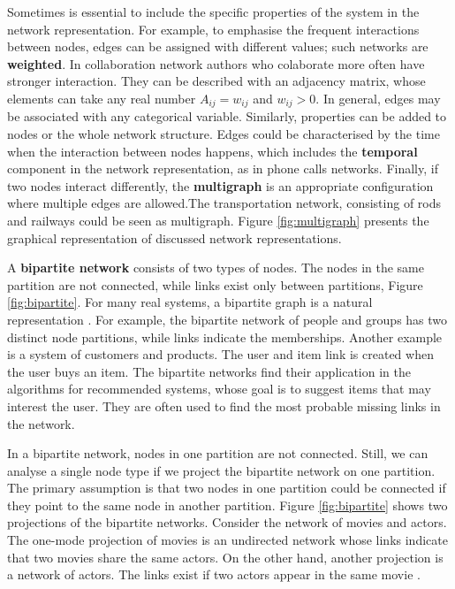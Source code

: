Sometimes is essential to include the specific properties of the system in the network representation. For example, to emphasise the frequent interactions between nodes, edges can be assigned with different values; such networks are \textbf{weighted}. In collaboration network authors who colaborate more often have stronger interaction. They can be described with an adjacency matrix, whose elements can take any real number $A_{ij}=w_{ij}$ and $w_{ij}>0$. In general, edges may be associated with any categorical variable. Similarly, properties can be added to nodes or the whole network structure. Edges could be characterised by the time when the interaction between nodes happens, which includes the \textbf{temporal} component in the network representation, as in phone calls networks. Finally, if two nodes interact differently, the \textbf{multigraph} is an appropriate configuration where multiple edges are allowed.The transportation network, consisting of rods and railways could be seen as multigraph. Figure \ref{fig:multigraph} presents the graphical representation of discussed network representations.

A \textbf{bipartite network} consists of two types of nodes. The nodes in the same partition are not connected, while links exist only between partitions, Figure \ref{fig:bipartite}. For many real systems, a bipartite graph is a natural representation \cite{barabasi2016network, latora2017complex}. For example, the bipartite network of people and groups has two distinct node partitions, while links indicate the memberships. Another example is a system of customers and products. The user and item link is created when the user buys an item. The bipartite networks find their application in the algorithms for recommended systems, whose goal is to suggest items that may interest the user. They are often used to find the most probable missing links in the network. 

In a bipartite network, nodes in one partition are not connected. Still, we can analyse a single node type if we project the bipartite network on one partition. The primary assumption is that two nodes in one partition could be connected if they point to the same node in another partition. Figure \ref{fig:bipartite} shows two projections of the bipartite networks. Consider the network of movies and actors. The one-mode projection of movies is an undirected network whose links indicate that two movies share the same actors. On the other hand, another projection is a network of actors. The links exist if two actors appear in the same movie \cite{newman2010, barabasi2016network}.

